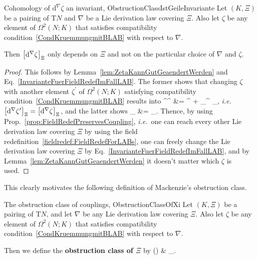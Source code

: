 \documentclass[preprint]{elsarticle}
\def\ba#1\ea{\begin{align}#1\end{align}}
\def\bas#1\eas{\begin{align*}#1\end{align*}}
\theoremstyle{plain}
\theoremstyle{remark}
\theoremstyle{definition}
\begin{document}
\begin{theorems}{Cohomology of $\mathrm{d}^\nabla \zeta$ an invariant, \newline \cite[\S 7.2, Theorem 7.2.12, Mackenzie denotes $\mathrm{d}^\Xi$ with $\rho^\Xi$, $\zeta$ with $\Lambda$, $\mathrm{d}^\nabla \zeta$ with $f(\nabla, \Lambda)$, and replace $A$ with $\mathrm{T}N$; page 277]{mackenzieGeneralTheory}}{ObstructionClassIstGeileInvariante}
Let $(K, \Xi)$ be a pairing of $\mathrm{T}N$ and $\nabla$ be a Lie derivation law covering $\Xi$. Also let $\zeta$ be any element of  $\Omega^2(N; K)$ that satisfies compatibility condition~\eqref{CondKruemmungmitBLAB} with respect to $\nabla$.

Then $\mleft[ \mathrm{d}^\nabla \zeta \mright]_\Xi$ only depends on $\Xi$ and not on the particular choice of $\nabla$ and $\zeta$.
\end{theorems}

\begin{proof}
\leavevmode\newline
This follows by Lemma~\ref{lem:ZetaKannGutGeaendertWerden} and Eq.~\eqref{InvarianteFuerFieldRedefImFallLAB}. The former shows that changing $\zeta$ with another element $\zeta^\prime$ of $\Omega^2(N; K)$ satisfying compatibility condition~\eqref{CondKruemmungmitBLAB} results into
\bas
\mathrm{d}^\nabla \zeta^\prime
&=
^\nabla \zeta
	+ _{^\Xi{}}
\in {}_\Xi,
\eas
\textit{i.e.}~$\mleft[\mathrm{d}^\nabla \zeta^\prime\mright]_\Xi = \mleft[\mathrm{d}^\nabla \zeta \mright]_\Xi$, and the latter shows 
\bas
\mleft[ \mathrm{d}^{\widetilde{\nabla}^\lambda} \widetilde{\zeta}^\lambda \mright]_\Xi
&=
_\Xi.
\eas
Thence, by using Prop.~\ref{prop:FieldRedefPreservesCoupling}, \textit{i.e.}~one can reach every other Lie derivation law covering $\Xi$ by using the field redefinition~\ref{fieldredef:FieldRedefForLABs}, one can freely change the Lie derivation law covering $\Xi$ by Eq.~\eqref{InvarianteFuerFieldRedefImFallLAB}, and by Lemma~\ref{lem:ZetaKannGutGeaendertWerden} it doesn't matter which $\zeta$ is used.
\end{proof}

This clearly motivates the following definition of Mackenzie's obstruction class.

\begin{definitions}{The obstruction class of couplings, \newline \cite[\S 7.2, comment after Theorem 7.2.12; page 277]{mackenzieGeneralTheory}}{ObstructionClassOfXi}
Let $(K, \Xi)$ be a pairing of $\mathrm{T}N$, and let $\nabla$ be any Lie derivation law covering $\Xi$. Also let $\zeta$ be any element of  $\Omega^2(N; K)$ that satisfies compatibility condition~\eqref{CondKruemmungmitBLAB} with respect to $\nabla$.

Then we define the \textbf{obstruction class of $\Xi$} by
\ba
\mathrm{Obs}(\Xi)
&\coloneqq
{}_\Xi.
\ea
\end{definitions}
\end{document}
